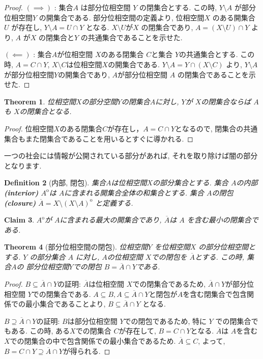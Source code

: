 \documentclass[dvipdfmx]{jbook}
\newcommand{\cl}[1]{\overline{ #1}  }
\newcommand{\Int}[1]{#1 ^{\mathrm{o}} }
\newtheorem{theorem}{Theorem}[section]
\newtheorem{definition}[theorem]{Definition}
\newtheorem{claim}[theorem]{Claim}
\theoremstyle{remark}
\theoremstyle{plain}
\begin{document}
\begin{proof}
	$\left( \implies \right) $ : 集合$A$ は部分位相空間 $Y$ の閉集合とする. 
	この時, $Y\setminus A$ が部分位相空間$Y$ の開集合である.
	部分位相空間の定義より, 位相空間$X$ のある開集合 $U$ が存在し, $Y\setminus A = U \cap Y$ となる. 
	$X\setminus U$が$X$ の閉集合であり, $A = \left( X \setminus U \right) \cap Y$ より, $A$ が$X$ の閉集合と$Y$ の共通集合であることを示せた.
	
	$\left( \impliedby \right) $ : 集合$A$が位相空間 $X$のある閉集合 $C$と集合 $Y$の共通集合とする.
	この時, $A=C\cap Y$,  $X\setminus C$は位相空間$X$の開集合である.
	$Y\setminus A = Y\cap \left( X \setminus C \right) $  より, $Y\setminus A$が部分位相空間$Y$の開集合であり,  $A$が部分位相空間 $A$ の閉集合であることを示せた.
\end{proof}

\begin{theorem}
\label{the:closedset}
	位相空間$X$の部分空間$Y$の閉集合$A$に対し,  $Y$が $X$の閉集合ならば $A$も $X$の閉集合となる.
\end{theorem}

\begin{proof}
	位相空間$X$のある閉集合$C$が存在し，$A = C\cap Y$となるので, 閉集合の共通集合もまた閉集合であることを用いるとすぐに導かれる.
\end{proof}

一つの社会には情報が公開されている部分があれば, それを取り除けば闇の部分となります.

\begin{definition}[内部, 閉包]
	集合$A$は位相空間$X$の部分集合とする. 
	集合 $A$の内部\textbf{(interior)} $\Int{A}$は $A$に含まれる開集合全体の和集合とする. 
	集合 $A$の閉包\textbf{(closure)} $\cl{A}= X \setminus\Int{ \left( X\setminus A \right)}$ と定義する.
\end{definition}

\begin{claim}
	$\Int{A}$が $A$に含まれる最大の開集合であり,  $\cl{A}$は $A$ を含む最小の閉集合である.
\end{claim}

\begin{theorem}[部分位相空間の閉包]
	位相空間$Y$ を位相空間$X$ の部分位相空間とする. 
	$Y$ の部分集合 $A$ に対し, $A$の位相空間 $X$での閉包を $\cl{A}$とする.
	この時, 集合$A$の 部分位相空間$Y$での閉包 $B= \cl{A} \cap Y$である.
\end{theorem}

\begin{proof}
	$B \subseteq \cl{A} \cap Y $の証明:  $\cl{A}$は位相空間 $X$での閉集合であるため,  $\cl{A} \cap Y $が部分位相空間 $Y$での閉集合である.  
	$A \subseteq B, A \subseteq \cl{A} \cap Y$と閉包が$A$を含む閉集合で包含関係での最小集合であることより, $B \subseteq \cl{A} \cap Y$ となる.

	$B \supseteq \cl{A} \cap Y$の証明:  $B$は部分位相空間 $Y$での閉包であるため, 特に $Y$ での閉集合でもある. 
	この時, ある$X$での閉集合 $C$が存在して,  $B=C \cap Y$となる.  
	$\cl{A}$は $A$を含む $X$での閉集合の中で包含関係での最小集合であるため. 
	$\cl{A} \subseteq C$, よって,  $B = C \cap Y \supseteq \cl{A} \cap Y$が得られる.
\end{proof}
\end{document}

